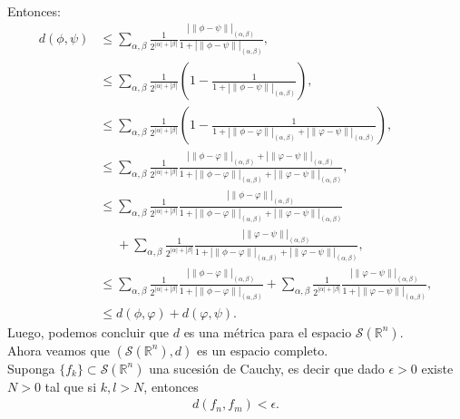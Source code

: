 \begin{homeworkProblem}
\begin{solution}
\begin{align*}
		\end{align*}
		Entonces:
		\begin{align*}
		  d(\phi,\psi)&\leq \sum_{\alpha,\beta}\frac{1}{2^{|\alpha|+|\beta|}}\frac{|\|\phi-\psi\||_{(\alpha,\beta)}}{1+|\|\phi-\psi\||_{(\alpha,\beta)}},\\
			&\leq \sum_{\alpha,\beta}\frac{1}{2^{|\alpha|+|\beta|}}\left(1-\frac{1}{1+|\|\phi-\psi\||_{(\alpha,\beta)}}\right),\\
			&\leq \sum_{\alpha,\beta}\frac{1}{2^{|\alpha|+|\beta|}}\left(1-\frac{1}{1+|\|\phi-\varphi\||_{(\alpha,\beta)}+|\|\varphi-\psi\||_{(\alpha,\beta)}}\right),\\
			&\leq\sum_{\alpha,\beta}\frac{1}{2^{|\alpha|+|\beta|}}\frac{|\|\phi-\varphi\||_{(\alpha,\beta)}+|\|\varphi-\psi\||_{(\alpha,\beta)}}{1+|\|\phi-\varphi\||_{(\alpha,\beta)}+|\|\varphi-\psi\||_{(\alpha,\beta)}},\\
			&\leq\sum_{\alpha,\beta}\frac{1}{2^{|\alpha|+|\beta|}}\frac{|\|\phi-\varphi\||_{(\alpha,\beta)}}{1+|\|\phi-\varphi\||_{(\alpha,\beta)}+|\|\varphi-\psi\||_{(\alpha,\beta)}}\\
      &\phantom{\leq}+\sum_{\alpha,\beta}\frac{1}{2^{|\alpha|+|\beta|}}\frac{|\|\varphi-\psi\||_{(\alpha,\beta)}}{1+|\|\phi-\varphi\||_{(\alpha,\beta)}+|\|\varphi-\psi\||_{(\alpha,\beta)}},\\
			&\leq\sum_{\alpha,\beta}\frac{1}{2^{|\alpha|+|\beta|}}\frac{|\|\phi-\varphi\||_{(\alpha,\beta)}}{1+|\|\phi-\varphi\||_{(\alpha,\beta)}}+\sum_{\alpha,\beta}\frac{1}{2^{|\alpha|+|\beta|}}\frac{|\|\varphi-\psi\||_{(\alpha,\beta)}}{1+|\|\varphi-\psi\||_{(\alpha,\beta)}},\\
			&\leq d(\phi,\varphi)+d(\varphi,\psi).
		\end{align*}
		Luego, podemos concluir que $d$ es una métrica para el espacio $\mathcal{S}(\mathbb{R}^n)$.\\
    Ahora veamos que $(\mathcal{S}(\mathbb{R}^{n}),d)$ es un espacio completo.\\
    Suponga $\{f_{k}\}\subset\mathcal{S}(\mathbb{R}^{n})$ una sucesión de Cauchy, es decir que dado $\epsilon>0$ existe $N>0$ tal que si $k,l>N$, entonces
    \begin{align*}
      d(f_{n},f_{m})<\epsilon.
    \end{align*}


\end{solution}
\end{homeworkProblem}
